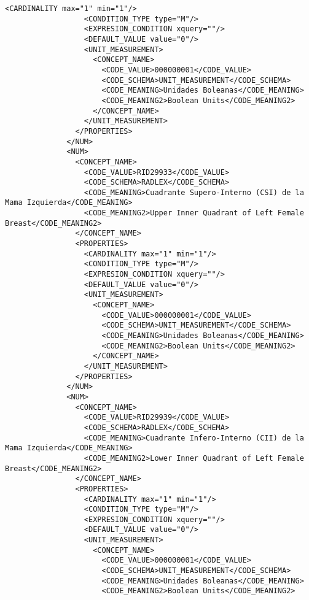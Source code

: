 \begin{lstlisting}[label=dicom-report,caption=Informe estructurado de una exploración de mama]
                  <CARDINALITY max="1" min="1"/>
                  <CONDITION_TYPE type="M"/>
                  <EXPRESION_CONDITION xquery=""/>
                  <DEFAULT_VALUE value="0"/>
                  <UNIT_MEASUREMENT>
                    <CONCEPT_NAME>
                      <CODE_VALUE>000000001</CODE_VALUE>
                      <CODE_SCHEMA>UNIT_MEASUREMENT</CODE_SCHEMA>
                      <CODE_MEANING>Unidades Boleanas</CODE_MEANING>
                      <CODE_MEANING2>Boolean Units</CODE_MEANING2>
                    </CONCEPT_NAME>
                  </UNIT_MEASUREMENT>
                </PROPERTIES>
              </NUM>
              <NUM>
                <CONCEPT_NAME>
                  <CODE_VALUE>RID29933</CODE_VALUE>
                  <CODE_SCHEMA>RADLEX</CODE_SCHEMA>
                  <CODE_MEANING>Cuadrante Supero-Interno (CSI) de la Mama Izquierda</CODE_MEANING>
                  <CODE_MEANING2>Upper Inner Quadrant of Left Female Breast</CODE_MEANING2>
                </CONCEPT_NAME>
                <PROPERTIES>
                  <CARDINALITY max="1" min="1"/>
                  <CONDITION_TYPE type="M"/>
                  <EXPRESION_CONDITION xquery=""/>
                  <DEFAULT_VALUE value="0"/>
                  <UNIT_MEASUREMENT>
                    <CONCEPT_NAME>
                      <CODE_VALUE>000000001</CODE_VALUE>
                      <CODE_SCHEMA>UNIT_MEASUREMENT</CODE_SCHEMA>
                      <CODE_MEANING>Unidades Boleanas</CODE_MEANING>
                      <CODE_MEANING2>Boolean Units</CODE_MEANING2>
                    </CONCEPT_NAME>
                  </UNIT_MEASUREMENT>
                </PROPERTIES>
              </NUM>
              <NUM>
                <CONCEPT_NAME>
                  <CODE_VALUE>RID29939</CODE_VALUE>
                  <CODE_SCHEMA>RADLEX</CODE_SCHEMA>
                  <CODE_MEANING>Cuadrante Infero-Interno (CII) de la Mama Izquierda</CODE_MEANING>
                  <CODE_MEANING2>Lower Inner Quadrant of Left Female Breast</CODE_MEANING2>
                </CONCEPT_NAME>
                <PROPERTIES>
                  <CARDINALITY max="1" min="1"/>
                  <CONDITION_TYPE type="M"/>
                  <EXPRESION_CONDITION xquery=""/>
                  <DEFAULT_VALUE value="0"/>
                  <UNIT_MEASUREMENT>
                    <CONCEPT_NAME>
                      <CODE_VALUE>000000001</CODE_VALUE>
                      <CODE_SCHEMA>UNIT_MEASUREMENT</CODE_SCHEMA>
                      <CODE_MEANING>Unidades Boleanas</CODE_MEANING>
                      <CODE_MEANING2>Boolean Units</CODE_MEANING2>

\end{lstlisting}
